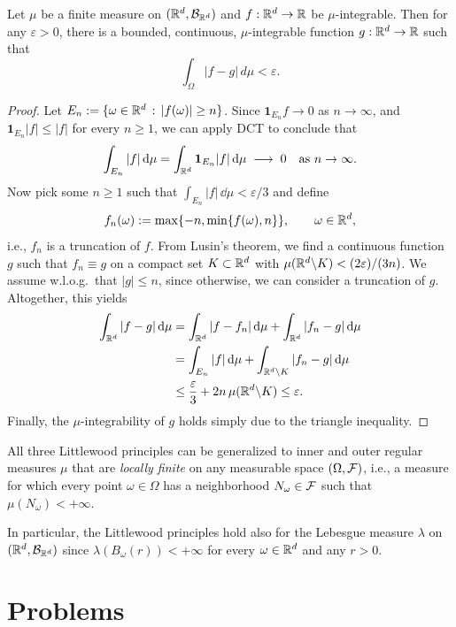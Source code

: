 \begin{theorem}\label{thm:L1-approximation}
	Let $\mu$ be a finite measure on $(\mathbb R^d,\mathcal B_{\mathbb R^d})$ and $f:\mathbb R^d\to\mathbb R$ be $\mu$-integrable. Then for any $\varepsilon>0$, there is a bounded, continuous, $\mu$-integrable function $g:\mathbb R^d\to\mathbb R$ such that
	\[
		\int_\Omega |f-g|\,d\mu <\varepsilon.
	\]
\end{theorem}
\begin{proof}
	Let $E_n:=\{\omega\in\mathbb R^d\,:\, |f(\omega)|\ge n\}$. Since $\mathbf{1}_{E_n}f \to 0$ as $n\to\infty$, and $\mathbf{1}_{E_n}|f|\le |f|$ for every $n\ge 1$, we can apply DCT to conclude that
	\[
		\int_{E_n} |f|\,\mathrm{d}\mu = \int_{\mathbb R^d} \mathbf{1}_{E_n}|f|\,\mathrm{d}\mu\;\longrightarrow\;0\quad\text{as $n\to\infty$}.
	\]
	Now pick some $n\ge 1$ such that $\int_{E_n} |f|\,\dd\mu <\varepsilon/3$ and define
	\[
		f_n(\omega):= \max\{-n,\min\{f(\omega),n\}\}, \qquad\omega\in\mathbb R^d,
	\]
	i.e., $f_n$ is a truncation of $f$. From Lusin's theorem, we find a continuous function $g$ such that $f_n\equiv g$ on a compact set $K\subset\mathbb R^d$ with $\mu(\mathbb R^d\backslash K)<(2\varepsilon)/(3n)$. We assume w.l.o.g.\ that $|g|\le n$, since otherwise, we can consider a truncation of $g$. Altogether, this yields
	\begin{align*}
		\int_{\mathbb R^d} |f-g|\,\mathrm{d}\mu &= \int_{\mathbb R^d} |f-f_n|\,\mathrm{d}\mu + \int_{\mathbb R^d} |f_n-g|\,\mathrm{d}\mu \\
		&= \int_{E_n} |f|\,\mathrm{d}\mu + \int_{\mathbb R^d\backslash K} |f_n-g|\,\mathrm{d}\mu \\
		&\le \frac{\varepsilon}{3} + 2n\,\mu(\mathbb R^d\backslash K) \le  \varepsilon.
	\end{align*}
	Finally, the $\mu$-integrability of $g$ holds simply due to the triangle inequality.
\end{proof}

\begin{remark}
	All three Littlewood principles can be generalized to inner and outer regular measures $\mu$ that are \emph{locally finite} on any measurable space $(\Omega,\mathcal F)$, i.e., a measure for which every point $\omega\in\Omega$ has a neighborhood $N_\omega\in\mathcal F$ such that $\mu(N_\omega)<+\infty$. 
	
	In particular, the Littlewood principles hold also for the Lebesgue measure $\lambda$ on $(\mathbb R^d,\mathcal B_{\mathbb R^d})$ since $\lambda(B_\omega(r))<+\infty$ for every $\omega\in\mathbb R^d$ and any $r>0$.
\end{remark}   

\section{Problems}

